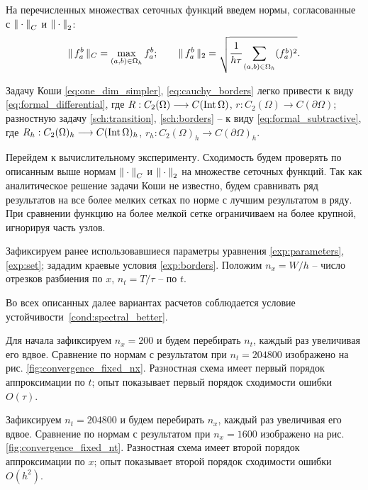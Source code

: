 На перечисленных множествах сеточных функций введем нормы, согласованные с ${\| \cdot \|}_C$ и ${\| \cdot \|}_2$:
$$\| \, f_a^b \, \|_C = \max \limits_{(a, b) \in \Omega_h} f_a^b; \qquad \| \, f_a^b \, \|_2 = \sqrt{\cfrac{1}{h \tau}\sum \limits_{(a, b) \in \Omega_h} (f_a^b)^2} {\text{.}}$$

Задачу Коши \eqref{eq:one_dim_simpler}, \eqref{eq:cauchy_borders} легко привести к виду \eqref{eq:formal_differential}, где $R: C_2(\Omega) \longrightarrow C(\operatorname{{Int}} \Omega)$, $r: C_2(\Omega) \longrightarrow C(\partial \Omega)$; разностную задачу \eqref{sch:transition}, \eqref{sch:borders} -- к виду \eqref{eq:formal_subtractive}, где $R_h: C_2(\Omega)_h \longrightarrow C(\operatorname{{Int}} \Omega)_h$, $r_h: C_2(\Omega)_h \longrightarrow C(\partial \Omega)_h$.

Перейдем к вычислительному эксперименту. Сходимость будем проверять по описанным выше нормам ${\| \cdot \|}_C$ и ${\| \cdot \|}_2$ на множестве сеточных функций. Так как аналитическое решение задачи Коши не известно, будем сравнивать ряд результатов на все более мелких сетках по норме с лучшим результатом в ряду. При сравнении функцию на более мелкой сетке ограничиваем на более крупной, игнорируя часть узлов.

Зафиксируем ранее использовавшиеся параметры уравнения \eqref{exp:parameters}, \eqref{exp:set}; зададим краевые условия \eqref{exp:borders}. Положим $n_x = W / h$ -- число отрезков разбиения по $x$, $n_t = T / \tau$ -- по $t$.

Во всех описанных далее вариантах расчетов соблюдается условие устойчивости~\eqref{cond:spectral_better}.

Для начала зафиксируем $n_x = 200$ и будем перебирать $n_t$, каждый раз увеличивая его вдвое. Сравнение по нормам с результатом при $n_t = 204800$ изображено на рис. \ref{fig:convergence_fixed_nx}. Разностная схема имеет первый порядок аппроксимации по $t$; опыт показывает первый порядок сходимости ошибки $O(\tau)$.

Зафиксируем $n_t = 204800$ и будем перебирать $n_x$, каждый раз увеличивая его вдвое. Сравнение по нормам с результатом при $n_x = 1600$ изображено на рис. \ref{fig:convergence_fixed_nt}. Разностная схема имеет второй порядок аппроксимации по $x$; опыт показывает второй порядок сходимости ошибки $O(h^2)$.

